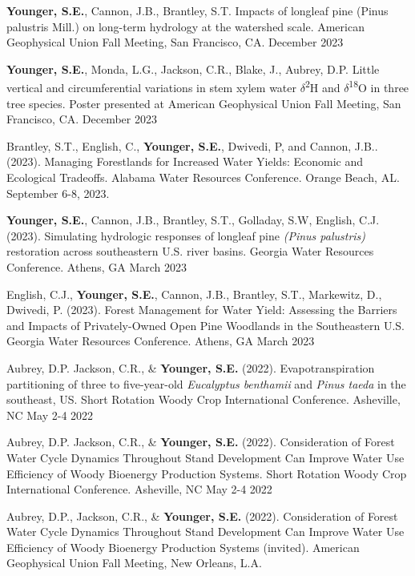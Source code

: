 \documentclass[10pt,letterpaper]{article}
\begin{document}
	\begin{hangparas}{.25in}{1}
		
		\textbf{Younger, S.E.}, Cannon, J.B., Brantley, S.T. Impacts of longleaf pine (Pinus palustris Mill.) on long-term hydrology at the watershed scale. American Geophysical Union Fall Meeting, San Francisco, CA. December 2023
		
		\textbf{Younger, S.E.}, Monda, L.G., Jackson, C.R., Blake, J., Aubrey, D.P. Little vertical and circumferential variations in stem xylem water $\delta$\textsuperscript{2}H and $\delta$\textsuperscript{18}O in three tree species. Poster presented at American Geophysical Union Fall Meeting, San Francisco, CA. December 2023
		
		Brantley, S.T., English, C., \textbf{Younger, S.E.}, Dwivedi, P, and Cannon, J.B.. (2023). Managing Forestlands for Increased Water Yields: Economic and Ecological Tradeoffs. Alabama Water Resources Conference. Orange Beach, AL. September 6-8, 2023.
	
		\textbf{Younger, S.E.}, Cannon, J.B., Brantley, S.T., Golladay, S.W, English, C.J. (2023). Simulating hydrologic responses of longleaf pine \textit{(Pinus palustris)} restoration across southeastern U.S. river basins. Georgia Water Resources Conference. Athens, GA March 2023
		
		English, C.J., \textbf{Younger, S.E.}, Cannon, J.B., Brantley, S.T., Markewitz, D., Dwivedi, P. (2023). Forest Management for Water Yield: Assessing the Barriers and Impacts of Privately-Owned Open Pine Woodlands in the Southeastern U.S. Georgia Water Resources Conference. Athens, GA March 2023
		
		Aubrey, D.P. Jackson, C.R., \& \textbf{Younger, S.E.} (2022). Evapotranspiration partitioning of three to five-year-old \textit{Eucalyptus benthamii} and \textit{Pinus taeda} in the southeast, US. Short Rotation Woody Crop International Conference. Asheville, NC May 2-4 2022
		
		Aubrey, D.P. Jackson, C.R., \& \textbf{Younger, S.E.} (2022). Consideration of Forest Water Cycle Dynamics Throughout Stand Development Can Improve Water Use Efficiency of Woody Bioenergy Production Systems. Short Rotation Woody Crop International Conference. Asheville, NC May 2-4 2022
		
		Aubrey, D.P., Jackson, C.R., \& \textbf{Younger, S.E.} (2022). Consideration of Forest Water Cycle Dynamics Throughout Stand Development Can Improve Water Use Efficiency of Woody Bioenergy Production Systems (invited). American Geophysical Union Fall Meeting, New Orleans, L.A.
		

\end{hangparas}
\end{document}
